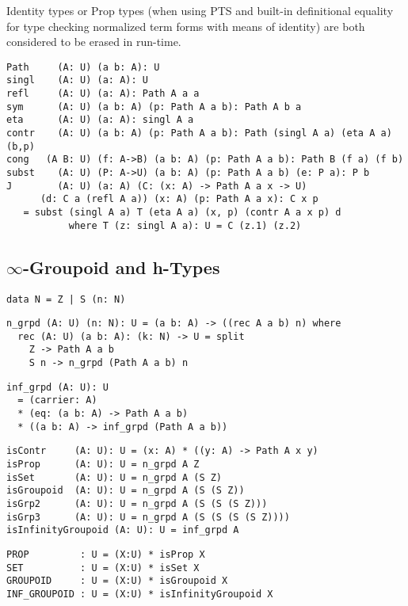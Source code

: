\documentclass{article}
\begin{document}
Identity types or Prop types (when using PTS and built-in definitional equality for type checking
normalized term forms with means of identity) are both considered to be erased in run-time.

\begin{lstlisting}[mathescape=true]
Path     (A: U) (a b: A): U
singl    (A: U) (a: A): U
refl     (A: U) (a: A): Path A a a
sym      (A: U) (a b: A) (p: Path A a b): Path A b a
eta      (A: U) (a: A): singl A a
contr    (A: U) (a b: A) (p: Path A a b): Path (singl A a) (eta A a) (b,p)
cong   (A B: U) (f: A->B) (a b: A) (p: Path A a b): Path B (f a) (f b)
subst    (A: U) (P: A->U) (a b: A) (p: Path A a b) (e: P a): P b
J        (A: U) (a: A) (C: (x: A) -> Path A a x -> U)
      (d: C a (refl A a)) (x: A) (p: Path A a x): C x p
   = subst (singl A a) T (eta A a) (x, p) (contr A a x p) d
           where T (z: singl A a): U = C (z.1) (z.2)
\end{lstlisting}

\subsection{$\infty$-Groupoid and h-Types}

\begin{lstlisting}[mathescape=true]
data N = Z | S (n: N)
\end{lstlisting}

\begin{lstlisting}[mathescape=true]
n_grpd (A: U) (n: N): U = (a b: A) -> ((rec A a b) n) where
  rec (A: U) (a b: A): (k: N) -> U = split
    Z -> Path A a b
    S n -> n_grpd (Path A a b) n
\end{lstlisting}

\begin{lstlisting}
inf_grpd (A: U): U
  = (carrier: A)
  * (eq: (a b: A) -> Path A a b)
  * ((a b: A) -> inf_grpd (Path A a b))
\end{lstlisting}

\begin{lstlisting}[mathescape=true]
isContr     (A: U): U = (x: A) * ((y: A) -> Path A x y)
isProp      (A: U): U = n_grpd A Z
isSet       (A: U): U = n_grpd A (S Z)
isGroupoid  (A: U): U = n_grpd A (S (S Z))
isGrp2      (A: U): U = n_grpd A (S (S (S Z)))
isGrp3      (A: U): U = n_grpd A (S (S (S (S Z))))
isInfinityGroupoid (A: U): U = inf_grpd A
\end{lstlisting}

\begin{lstlisting}[mathescape=true]
PROP         : U = (X:U) * isProp X
SET          : U = (X:U) * isSet X
GROUPOID     : U = (X:U) * isGroupoid X
INF_GROUPOID : U = (X:U) * isInfinityGroupoid X
\end{lstlisting}
\end{document}
